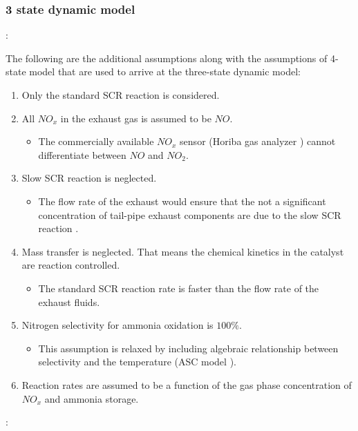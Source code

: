\subsubsection{3 state dynamic model}
:

The following are the additional assumptions along with the assumptions of
4-state model that are used to arrive at the three-state dynamic model\cite{devarakonda2009model}:
\begin{enumerate}
    \item Only the standard SCR reaction is considered.
    \item All $NO_x$ in the exhaust gas is assumed to be $NO$.
    \begin{itemize}
        \item The commercially available $NO_x$ sensor (Horiba gas analyzer \cite{nova2014urea}) cannot differentiate between $NO$ and $NO_2$.
    \end{itemize}
    \item Slow SCR reaction is neglected.
    \begin{itemize}
        \item The flow rate of the exhaust would ensure that the not a significant concentration of tail-pipe exhaust components are due to the slow SCR reaction \cite{nova2014urea}.
    \end{itemize}
    \item Mass transfer is neglected. That means the chemical kinetics in the catalyst are reaction controlled.
    \begin{itemize}
        \item The standard SCR reaction rate is faster than the flow rate of the exhaust fluids.
    \end{itemize}
    \item Nitrogen selectivity for ammonia oxidation is $100\%$.
    \begin{itemize}
        \item This assumption is relaxed by including algebraic relationship between selectivity and the temperature (ASC model \cite{jain2023diagnostics}).
    \end{itemize}
    \item Reaction rates are assumed to be a function of the gas phase concentration of $NO_x$ and ammonia storage.
\end{enumerate}

:

